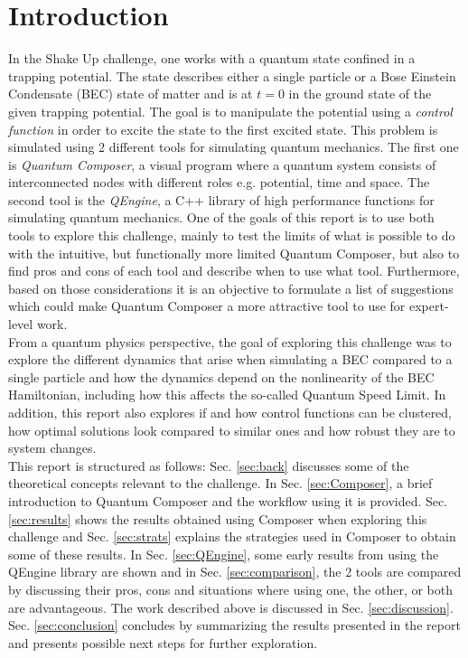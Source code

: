 \documentclass[a4paper, twocolumn]{revtex4-1}
\begin{document}
\section{Introduction}
In the Shake Up challenge, one works with a quantum state confined in a trapping potential. The state describes either a single particle or a Bose Einstein Condensate (BEC) state of matter and is at $t=0$ in the ground state of the given trapping potential. The goal is to manipulate the potential using a \textit{control function} in order to excite the state to the first excited state. This problem is simulated using 2 different tools for simulating quantum mechanics. The first one is \textit{Quantum Composer}, a visual program where a quantum system consists of interconnected nodes with different roles e.g. potential, time and space. The second tool is the \textit{QEngine}, a C++ library of high performance functions for simulating quantum mechanics. One of the goals of this report is to use both tools to explore this challenge, mainly to test the limits of what is possible to do with the intuitive, but functionally more limited Quantum Composer, but also to find pros and cons of each tool and describe when to use what tool. Furthermore, based on those considerations it is an objective to formulate a list of suggestions which could make Quantum Composer a more attractive tool to use for expert-level work.\\

From a quantum physics perspective, the goal of exploring this challenge was to explore the different dynamics that arise when simulating a BEC compared to a single particle and how the dynamics depend on the nonlinearity of the BEC Hamiltonian, including how this affects the so-called Quantum Speed Limit. In addition, this report also explores if and how control functions can be clustered, how optimal solutions look compared to similar ones and how robust they are to system changes.\\

This report is structured as follows: Sec. \ref{sec:back} discusses some of the theoretical concepts relevant to the challenge. In Sec. \ref{sec:Composer}, a brief introduction to Quantum Composer and the workflow using it is provided. Sec. \ref{sec:results} shows the results obtained using Composer when exploring this challenge and Sec. \ref{sec:strats} explains the strategies used in Composer to obtain some of these results. In Sec. \ref{sec:QEngine}, some early results from using the QEngine library are shown and in Sec. \ref{sec:comparison}, the 2 tools are compared by discussing their pros, cons and situations where using one, the other, or both are advantageous. The work described above is discussed in Sec. \ref{sec:discussion}. Sec. \ref{sec:conclusion} concludes by summarizing the results presented in the report and presents possible next steps for further exploration.
\end{document}
